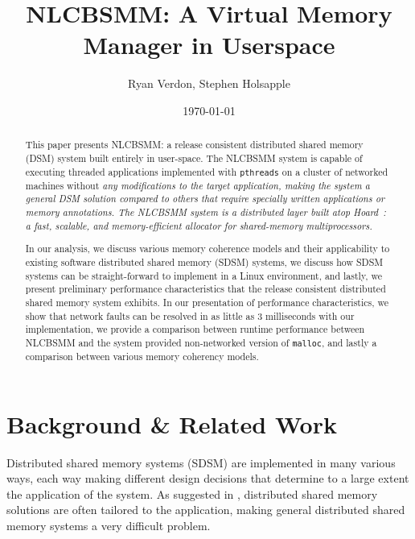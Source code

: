 \documentclass[10pt,conference]{IEEEtran}
\begin{document}
\title{\vfill NLCBSMM: A Virtual Memory Manager in Userspace} 
\author{Ryan Verdon, Stephen Holsapple}
\date{\today}
\maketitle

\def \projname {NLCBSMM}
\newtheorem{definition}{Definition}[section]
\newtheorem{condition}{Condition}[section]

\begin{abstract}
This paper presents \projname{}: a release consistent distributed shared memory (DSM) system built entirely in user-space.  The \projname{} system is capable of executing threaded applications implemented with \verb,pthreads, on a cluster of networked machines without \em any \em modifications to the target application, making the system a general DSM solution compared to others that require specially written applications or memory annotations.  The \projname{} system is a distributed layer built atop Hoard~\cite{Berger:1999:HFS:899944, Berger:2000:HSM:356989.357000}: a fast, scalable, and memory-efficient allocator for shared-memory multiprocessors.

In our analysis, we discuss various memory coherence models and their applicability to existing software distributed shared memory (SDSM) systems, we discuss how SDSM systems can be straight-forward to implement in a Linux environment, and lastly, we present preliminary performance characteristics that the release consistent distributed shared memory system exhibits.  In our presentation of performance characteristics, we show that network faults can be resolved in as little as 3 milliseconds with our implementation, we provide a comparison between runtime performance between \projname{} and the system provided non-networked version of \verb,malloc,, and lastly a comparison between various memory coherency models.

\end{abstract}

\section{Background \& Related Work}

Distributed shared memory systems (SDSM) are implemented in many various ways, each way making different design decisions that determine to a large extent the application of the system.  As suggested in \cite{Zwaenepoel:1992:MDS:134397.135235}, distributed shared memory solutions are often tailored to the application, making general distributed shared memory systems a very difficult problem. 
\end{document}
